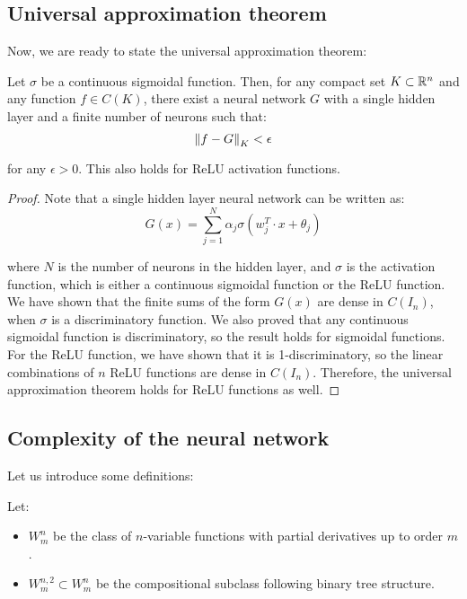 \subsection{Universal approximation theorem}

Now, we are ready to state the universal approximation theorem:

\begin{theorem}
    Let $\sigma$ be a continuous sigmoidal function. Then, for any compact set $K \subset \mathbb{R}^n$ and any
    function $f \in C(K)$, there exist a neural network $G$ with a single hidden layer and a finite number
    of neurons such that:
    $$\left\|f - G\right\|_K < \epsilon$$

    for any $\epsilon > 0$. This also holds for ReLU activation functions.
\end{theorem}

\begin{proof}
    Note that a single hidden layer neural network can be written as:
    $$G(x) = \sum_{j=1}^{N} \alpha_j \sigma(w_j^T \cdot x + \theta_j)$$

    where $N$ is the number of neurons in the hidden layer, and $\sigma$ is the activation function,
    which is either a continuous sigmoidal function or the ReLU function.\\

    We have shown that the finite sums of the form $G(x)$ are dense in $C(I_n)$, when $\sigma$ is a
    discriminatory function. We also proved that any continuous sigmoidal function is discriminatory,
    so the result holds for sigmoidal functions.\\

    For the ReLU function, we have shown that it is 1-discriminatory, so the linear combinations of
    $n$ ReLU functions are dense in $C(I_n)$. Therefore, the universal approximation theorem holds for
    ReLU functions as well.

\end{proof}

\subsection{Complexity of the neural network}

Let us introduce some definitions:

\begin{definition}
    Let:
    \begin{itemize}
        \item $W_m^{n}$ be the class of $n$-variable functions with partial derivatives up to order $m$.
        \item $W_m^{n,2} \subset W_m^n$ be the compositional subclass following binary tree structure.
    \end{itemize}
\end{definition}

